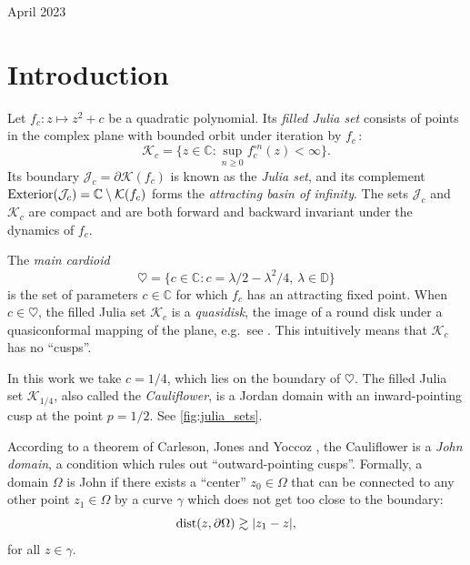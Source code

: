\begin{onehalfspace}
\begin{center}
April 2023
\par\end{center}
\end{onehalfspace}


\newpage

\tableofcontents
\newpage

\section{Introduction}

Let $f_c: z\mapsto z^2 + c$ be a quadratic polynomial. Its {\em filled Julia set} consists of points in the complex plane with bounded orbit
under iteration by $f_c$\,:
$$
\mathcal K_c = \bigl \{z \in \mathbb{C} : \sup_{n \ge 0} f_c^{\circ n}(z) < \infty \bigr \}.
$$
Its boundary $\mathcal J_c = \partial \mathcal K(f_c)$ is known as the {\em Julia set}\/, and its complement $\operatorname{Exterior}(\mathcal{J}_c) = \mathbb{C} \setminus \mathcal K(f_c)$ forms the {\em attracting basin of infinity}. The sets $\mathcal J_c$ and $\mathcal K_c$ are compact and are both forward and backward invariant under the dynamics of $f_c$.
 
The {\em main cardioid}
$$
\heartsuit = \bigl  \{c \in \mathbb{C}: c = \lambda/2 - \lambda^2/4,\, \lambda \in \mathbb{D} \bigr \}
$$
is the set of parameters $c \in \mathbb{C}$ for which $f_c$ has an attracting fixed point.
When $c \in \heartsuit$, the filled Julia set $\mathcal K_c$ is a \emph{quasidisk}\/, the image of a round disk under a quasiconformal mapping of the plane, e.g.~see \cite[Theorem VI.2.1]{gamelin2003complex}.
This intuitively means that $\mathcal K_c$ has no \enquote{cusps}.


In this work we take $c=1/4$, which lies on the boundary of $\heartsuit$. 
The filled Julia set $\mathcal K_{1/4}$, also called the \emph{Cauliflower}, 
is a Jordan domain with an inward-pointing cusp at the point $p=1/2$. See \cref{fig:julia_sets}.

According to a theorem of Carleson, Jones and Yoccoz \cite[Theorem 6.1]{carleson_julia_1994}, 
the Cauliflower is a \emph{John domain}\/, a condition which rules out \enquote{outward-pointing cusps}. 
Formally, a domain $\Omega$ is John if there exists a \enquote{center} 
$z_0 \in \Omega$ that can be connected 
to any other point $z_1\in \Omega$ by a curve $\gamma$ which does not get too close to the boundary:
\begin{equation}
	\operatorname{dist}(z, \partial \Omega) \gtrsim |z_1-z|,
\end{equation} for all $z\in \gamma$.

